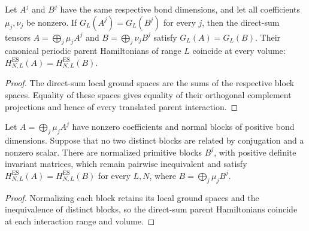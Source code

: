 \begin{lemma}
    \label{thm:ph_block_replacement_parent_equality}
    \leanok
    Let $A^j$ and $B^j$ have the same respective bond dimensions, and let
    all coefficients $\mu_j,\nu_j$ be nonzero. If $G_L(A^j)=G_L(B^j)$ for
    every $j$, then the direct-sum tensors $A=\bigoplus_j\mu_jA^j$ and
    $B=\bigoplus_j\nu_jB^j$ satisfy $G_L(A)=G_L(B)$.
    Their canonical periodic parent Hamiltonians of range $L$ coincide at
    every volume: $H^{\mathrm{ES}}_{N,L}(A)=H^{\mathrm{ES}}_{N,L}(B)$.
\end{lemma}
\begin{proof}
    \leanok
    The direct-sum local ground spaces are the sums of the respective block
    spaces. Equality of these spaces gives equality of their orthogonal
    complement projections and hence of every translated parent interaction.
\end{proof}

\begin{lemma}
    \label{thm:ph_primitive_representatives_parent_equality}
    \leanok
    Let $A=\bigoplus_j\mu_jA^j$ have nonzero coefficients and normal blocks
    of positive bond dimensions. Suppose that no two distinct blocks are
    related by conjugation and a nonzero scalar.
    There are normalized primitive blocks $B^j$, with positive definite
    invariant matrices, which remain pairwise inequivalent and satisfy
    $H^{\mathrm{ES}}_{N,L}(A)=H^{\mathrm{ES}}_{N,L}(B)$ for every $L,N$, where
    $B=\bigoplus_j\mu_jB^j$.
\end{lemma}
\begin{proof}
    \leanok
    Normalizing each block retains its local ground spaces and the
    inequivalence of distinct blocks, so the direct-sum parent Hamiltonians
    coincide at each interaction range and volume.
\end{proof}

